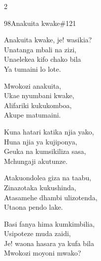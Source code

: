 \documentclass{article}
\begin{document}
\begin{multicols}{2}
\begin{hymn}{98}{Anakuita kwake}{\#121}
\begin{stanza}
Anakuita kwake, je! wasikia?\\
Unatanga mbali na zizi,\\
Unaelekea kifo chako bila\\
Ya tumaini lo lote.
\end{stanza}
\begin{chorus}
Mwokozi anakuita,\\
Ukae nyumbani kwake,\\
Alifariki kukukomboa,\\
Akupe matumaini.
\end{chorus}
\begin{stanza}
Kuna hatari katika njia yako,\\
Huna njia ya kujiponya,\\
Geuka na kumsikiliza sasa,\\
Mchungaji akutunze.
\end{stanza}
\begin{stanza}
Atakuondolea giza na taabu,\\
Zinazotaka kukushinda,\\
Atasamehe dhambi ulizotenda,\\
Utaona pendo lake.
\end{stanza}
\begin{stanza}
Basi fanya hima kumkimbilia,\\
Usipoteze muda zaidi,\\
Je! waona hasara ya kufa bila\\
Mwokozi moyoni mwako?
\end{stanza}
\end{hymn}


\end{multicols}
\end{document}

